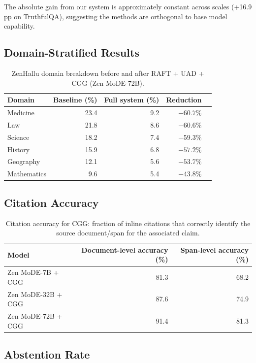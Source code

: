 \documentclass[11pt,a4paper]{article}
\begin{document}
The absolute gain from our system is approximately constant across scales (+16.9 pp on
TruthfulQA), suggesting the methods are orthogonal to base model capability.

\subsection{Domain-Stratified Results}

\begin{table}[H]
\centering
\caption{ZenHallu domain breakdown before and after RAFT + UAD + CGG (Zen MoDE-72B).}
\begin{tabular}{lrrrr}
\toprule
\textbf{Domain} & \textbf{Baseline (\%)} & \textbf{Full system (\%)} & \textbf{Reduction} \\
\midrule
Medicine    & 23.4 & 9.2  & $-60.7\%$ \\
Law         & 21.8 & 8.6  & $-60.6\%$ \\
Science     & 18.2 & 7.4  & $-59.3\%$ \\
History     & 15.9 & 6.8  & $-57.2\%$ \\
Geography   & 12.1 & 5.6  & $-53.7\%$ \\
Mathematics & 9.6  & 5.4  & $-43.8\%$ \\
\bottomrule
\end{tabular}
\label{tab:domain_results}
\end{table}

\subsection{Citation Accuracy}

\begin{table}[H]
\centering
\caption{Citation accuracy for CGG: fraction of inline citations that correctly identify
the source document/span for the associated claim.}
\begin{tabular}{lrr}
\toprule
\textbf{Model} & \textbf{Document-level accuracy (\%)} & \textbf{Span-level accuracy (\%)} \\
\midrule
Zen MoDE-7B + CGG  & 81.3 & 68.2 \\
Zen MoDE-32B + CGG & 87.6 & 74.9 \\
Zen MoDE-72B + CGG & 91.4 & 81.3 \\
\bottomrule
\end{tabular}
\label{tab:citation}
\end{table}

\subsection{Abstention Rate}
\end{document}
